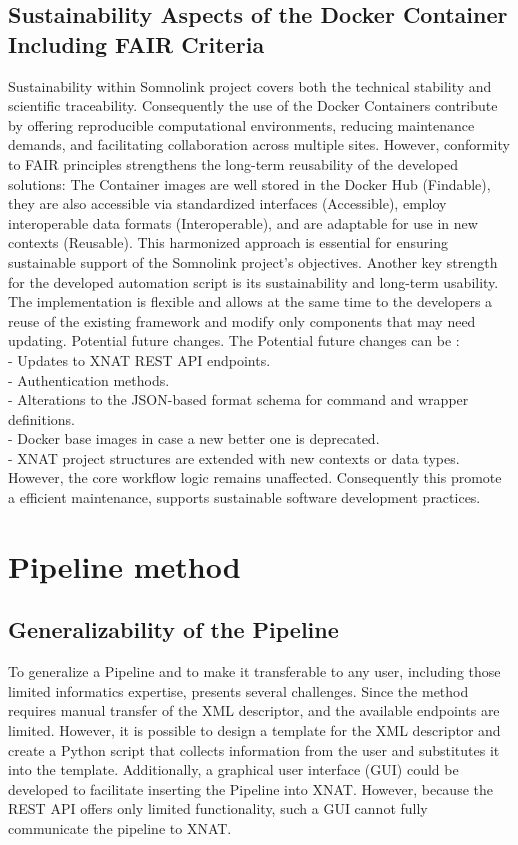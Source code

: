 \subsection{Sustainability Aspects of the Docker Container Including FAIR Criteria}
Sustainability within Somnolink project covers both the technical stability and scientific traceability. Consequently the use of the Docker Containers contribute by offering reproducible computational environments, reducing maintenance demands, and facilitating collaboration across multiple sites. However, conformity to FAIR principles strengthens the long-term reusability of the developed solutions: The Container images are well stored in the Docker Hub (Findable), they are also accessible via standardized interfaces (Accessible), employ interoperable data formats (Interoperable), and are adaptable for use in new contexts (Reusable). This harmonized approach is essential for ensuring sustainable support of the Somnolink project’s objectives. 
Another key strength for the developed automation script is its sustainability and long-term usability. The implementation is flexible and allows at the same time to the developers a reuse of the existing framework and modify only components that may need updating. Potential future changes. The Potential future changes can be :\\
- Updates to XNAT REST API endpoints.\\
- Authentication methods.\\
-  Alterations to the JSON-based format schema for command and wrapper definitions.\\
-  Docker base images in case a new better one is deprecated.\\
- XNAT project structures are extended with new contexts or data types.\\
However, the core workflow logic remains unaffected. Consequently this promote a efficient maintenance, supports sustainable software development practices.

\section{Pipeline method}
\subsection{Generalizability of the Pipeline}

To generalize a Pipeline and to make it transferable to any user, including those limited informatics expertise, presents several challenges.
Since the method requires manual transfer of the XML descriptor,  and the available endpoints are limited. 
However, it is possible to design a template for the XML descriptor and create a Python script that collects information from the user and substitutes it into the template. Additionally, a graphical user interface (GUI) could be developed to facilitate inserting the Pipeline into XNAT. However, because the REST API offers only limited functionality, such a GUI cannot fully communicate the pipeline to XNAT.



